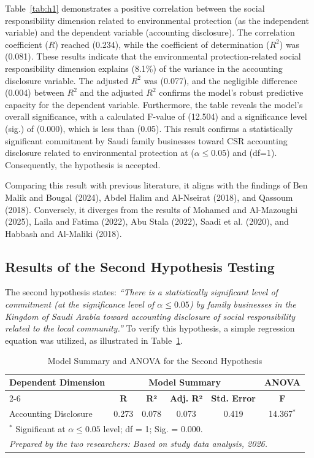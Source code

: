 \documentclass[10pt]{NSP1}
\begin{document}
Table~\ref{tab:h1} demonstrates a positive correlation between the social responsibility dimension related to environmental protection (as the independent variable) and the dependent variable (accounting disclosure). The correlation coefficient ($R$) reached (0.234), while the coefficient of determination ($R^2$) was (0.081). These results indicate that the environmental protection-related social responsibility dimension explains (8.1\%) of the variance in the accounting disclosure variable. The adjusted $R^2$ was (0.077), and the negligible difference (0.004) between $R^2$ and the adjusted $R^2$ confirms the model's robust predictive capacity for the dependent variable. Furthermore, the table reveals the model's overall significance, with a calculated F-value of (12.504) and a significance level (sig.) of (0.000), which is less than (0.05). This result confirms a statistically significant commitment by Saudi family businesses toward CSR accounting disclosure related to environmental protection at ($\alpha \leq 0.05$) and (df=1). Consequently, the hypothesis is accepted.

Comparing this result with previous literature, it aligns with the findings of Ben Malik and Bougal (2024), Abdel Halim and Al-Nseirat (2018), and Qassoum (2018). Conversely, it diverges from the results of Mohamed and Al-Mazoughi (2025), Laila and Fatima (2022), Abu Stala (2022), Saadi et al. (2020), and Habbash and Al-Maliki (2018).

\subsection{Results of the Second Hypothesis Testing}

The second hypothesis states: \emph{``There is a statistically significant level of commitment (at the significance level of $\alpha \leq 0.05$) by family businesses in the Kingdom of Saudi Arabia toward accounting disclosure of social responsibility related to the local community.''} To verify this hypothesis, a simple regression equation was utilized, as illustrated in Table~\ref{tab:h2}.

\begin{table}[H]
\centering
\caption{Model Summary and ANOVA for the Second Hypothesis}
\label{tab:h2}
\vspace{5pt}
\small
\begin{tabular}{lccccc}
\hline
\multirow{2}{*}{\textbf{Dependent Dimension}} & \multicolumn{4}{c}{\textbf{Model Summary}} & \multicolumn{1}{c}{\textbf{ANOVA}} \\
\cline{2-6}
 & \textbf{R} & \textbf{R²} & \textbf{Adj. R²} & \textbf{Std. Error} & \textbf{F} \\
\hline
Accounting Disclosure & 0.273 & 0.078 & 0.073 & 0.419 & 14.367$^{*}$ \\
\hline
\multicolumn{6}{l}{\footnotesize $^{*}$ Significant at $\alpha \leq 0.05$ level; df = 1; Sig. = 0.000.} \\
\multicolumn{6}{l}{\footnotesize \textit{Prepared by the two researchers: Based on study data analysis, 2026.}} \\
\end{tabular}
\end{table}
\end{document}
